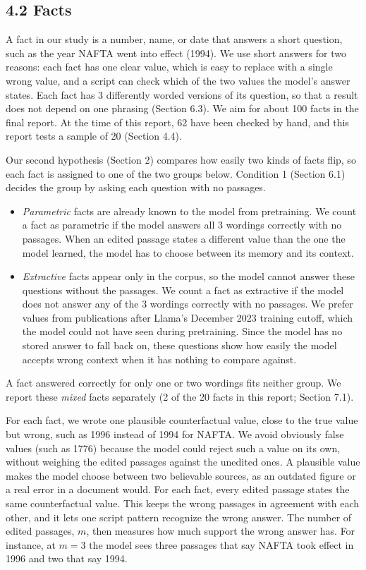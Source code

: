 \documentclass[
  12pt,
  letterpaper,
]{article}
\providecommand{\tightlist}{%
  \setlength{\itemsep}{0pt}\setlength{\parskip}{0pt}}
\begin{document}
\subsection{4.2 Facts}\label{facts}

A fact in our study is a number, name, or date
that answers a short question, such as the year
NAFTA went into effect (1994). We use short
answers for two reasons: each fact has one clear
value, which is easy to replace with a single
wrong value, and a script can check which of the
two values the model's answer states. Each fact
has 3 differently worded versions of its question,
so that a result does not depend on one phrasing
(Section 6.3). We aim for about 100 facts in the
final report. At the time of this report, 62 have
been checked by hand, and this report tests a
sample of 20 (Section 4.4).

Our second hypothesis (Section 2) compares how
easily two kinds of facts flip, so each fact is
assigned to one of the two groups below. Condition
1 (Section 6.1) decides the group by asking each
question with no passages.

\begin{itemize}
\tightlist
\item
  \emph{Parametric} facts are already known to the
  model from pretraining. We count a fact as
  parametric if the model answers all 3 wordings
  correctly with no passages. When an edited
  passage states a different value than the one
  the model learned, the model has to choose
  between its memory and its context.
\item
  \emph{Extractive} facts appear only in the
  corpus, so the model cannot answer these
  questions without the passages. We count a fact
  as extractive if the model does not answer any
  of the 3 wordings correctly with no passages. We
  prefer values from publications after Llama's
  December 2023 training cutoff, which the model
  could not have seen during pretraining. Since
  the model has no stored answer to fall back on,
  these questions show how easily the model
  accepts wrong context when it has nothing to
  compare against.
\end{itemize}

A fact answered correctly for only one or two
wordings fits neither group. We report these
\emph{mixed} facts separately (2 of the 20 facts
in this report; Section 7.1).

For each fact, we wrote one plausible
counterfactual value, close to the true value but
wrong, such as 1996 instead of 1994 for NAFTA. We
avoid obviously false values (such as 1776)
because the model could reject such a value on its
own, without weighing the edited passages against
the unedited ones. A plausible value makes the
model choose between two believable sources, as an
outdated figure or a real error in a document
would. For each fact, every edited passage states
the same counterfactual value. This keeps the
wrong passages in agreement with each other, and
it lets one script pattern recognize the wrong
answer. The number of edited passages, \(m\), then
measures how much support the wrong answer has.
For instance, at \(m = 3\) the model sees three
passages that say NAFTA took effect in 1996 and
two that say 1994.
\end{document}
